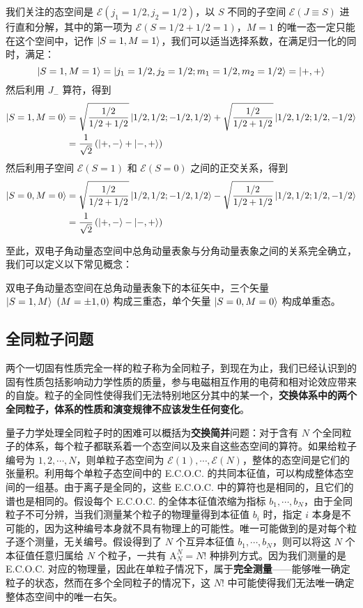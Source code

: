 \documentclass[cn,10pt,math=newtx,citestyle=gb7714-2015,bibstyle=gb7714-2015]{elegantbook}
\def\ms{\mathscr}
\def\mc{\mathcal}
\begin{document}
我们关注的态空间是 $\ms E(j_1=1/2,j_2=1/2)$，以 $S$ 不同的子空间 $\ms E(J\equiv S)$ 进行直和分解，其中的第一项为 $\ms E(S = 1/2+1/2=1)$，$M=1$ 的唯一态一定只能在这个空间中，记作 $\ket{S = 1,M=1}$，我们可以适当选择系数，在满足归一化的同时，满足：
\begin{equation}
    \ket{S=1,M=1} = \ket{j_1=1/2,j_2=1/2;m_1=1/2,m_2=1/2} = \ket{+,+}
\end{equation}
然后利用 $J_-$ 算符，得到
\begin{align}
    \ket{S=1,M=0} &= \sqrt{\frac{1/2}{1/2+1/2}}\ket{1/2,1/2;-1/2,1/2}+\sqrt{\frac{1/2}{1/2+1/2}}\ket{1/2,1/2;1/2,-1/2} \nonumber\\&= \frac 1{\sqrt 2}\left(\ket{+,-} + \ket{-,+}\right)
\end{align}
然后利用子空间 $\ms E(S=1)$ 和 $\ms E(S=0)$ 之间的正交关系，得到
\begin{align}
    \ket{S=0,M=0} &= \sqrt{\frac{1/2}{1/2+1/2}}\ket{1/2,1/2;-1/2,1/2}-\sqrt{\frac{1/2}{1/2+1/2}}\ket{1/2,1/2;1/2,-1/2} \nonumber\\&= \frac 1{\sqrt 2}\left(\ket{+,-} - \ket{-,+}\right)
\end{align}

至此，双电子角动量态空间中总角动量表象与分角动量表象之间的关系完全确立，我们可以定义以下常见概念：
\begin{definition}[单重态与三重态]
双电子角动量态空间在总角动量表象下的本征矢中，三个矢量 $\ket{S=1,M}\ (M=\pm 1,0)$ 构成三重态，单个矢量 $\ket{S=0,M=0}$ 构成单重态。

\end{definition}

\subsection{全同粒子问题}
两个一切固有性质完全一样的粒子称为全同粒子，到现在为止，我们已经认识到的固有性质包括影响动力学性质的质量，参与电磁相互作用的电荷和相对论效应带来的自旋。粒子的全同性使得我们无法特别地区分其中的某一个，\textbf{交换体系中的两个全同粒子，体系的性质和演变规律不应该发生任何变化}。

量子力学处理全同粒子时的困难可以概括为\textbf{交换简并}问题：对于含有 $N$ 个全同粒子的体系，每个粒子都联系着一个态空间以及来自这些态空间的算符。如果给粒子编号为 $1,2,\cdots,N$，则单粒子态空间为 $\mc E(1),\cdots,\mc E(N)$，整体的态空间是它们的张量积。利用每个单粒子态空间中的 E.C.O.C. 的共同本征值，可以构成整体态空间的一组基。由于离子是全同的，这些 E.C.O.C. 中的算符也是相同的，且它们的谱也是相同的。假设每个 E.C.O.C. 的全体本征值浓缩为指标 $b_1,\cdots,b_N$，由于全同粒子不可分辨，当我们测量某个粒子的物理量得到本征值 $b_i$ 时，指定 $i$ 本身是不可能的，因为这种编号本身就不具有物理上的可能性。唯一可能做到的是对每个粒子逐个测量，无关编号。假设得到了 $N$ 个互异本征值 $b_1,\cdots,b_N$，则可以将这 $N$ 个本征值任意归属给 $N$ 个粒子，一共有 $\text{A}_N^N = N!$ 种排列方式。因为我们测量的是 E.C.O.C. 对应的物理量，因此在单粒子情况下，属于\textbf{完全测量}——能够唯一确定粒子的状态，然而在多个全同粒子的情况下，这 $N!$ 中可能使得我们无法唯一确定整体态空间中的唯一右矢。
\end{document}
